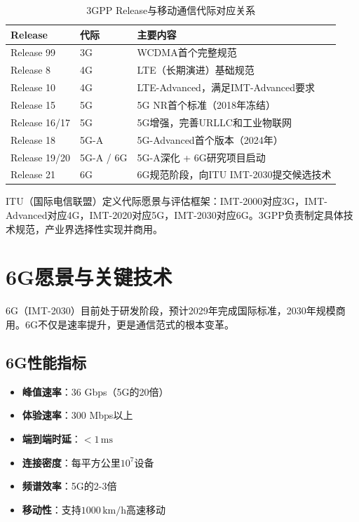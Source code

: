 \documentclass[12pt,UTF8]{ctexbook}
\begin{document}
\begin{table}[htbp]
\centering
\caption{3GPP Release与移动通信代际对应关系}
\label{tab:3gpp_releases}
\begin{tabular}{@{}llp{6cm}@{}}
    \toprule
    \textbf{Release} & \textbf{代际} & \textbf{主要内容} \\
    \midrule
    Release 99 & 3G & WCDMA首个完整规范 \\
    Release 8 & 4G & LTE（长期演进）基础规范 \\
    Release 10 & 4G & LTE-Advanced，满足IMT-Advanced要求 \\
    Release 15 & 5G & 5G NR首个标准（2018年冻结） \\
    Release 16/17 & 5G & 5G增强，完善URLLC和工业物联网 \\
    Release 18 & 5G-A & 5G-Advanced首个版本（2024年） \\
    Release 19/20 & 5G-A / 6G & 5G-A深化 + 6G研究项目启动 \\
    Release 21 & 6G & 6G规范阶段，向ITU IMT-2030提交候选技术 \\
    \bottomrule
\end{tabular}
\end{table}

ITU（国际电信联盟）定义代际愿景与评估框架：IMT-2000对应3G，IMT-Advanced对应4G，IMT-2020对应5G，IMT-2030对应6G。3GPP负责制定具体技术规范，产业界选择性实现并商用。

\section{6G愿景与关键技术}
\label{sec:6g_vision}

6G（IMT-2030）目前处于研发阶段，预计2029年完成国际标准，2030年规模商用。6G不仅是速率提升，更是通信范式的根本变革。

\subsection{6G性能指标}
\begin{itemize}[leftmargin=2cm]
    \item \textbf{峰值速率}：36 Gbps（5G的20倍）
    \item \textbf{体验速率}：300 Mbps以上
    \item \textbf{端到端时延}：$<1\,\mathrm{ms}$
    \item \textbf{连接密度}：每平方公里$10^7$设备
    \item \textbf{频谱效率}：5G的2-3倍
    \item \textbf{移动性}：支持$1000\,\mathrm{km/h}$高速移动
\end{itemize}
\end{document}
